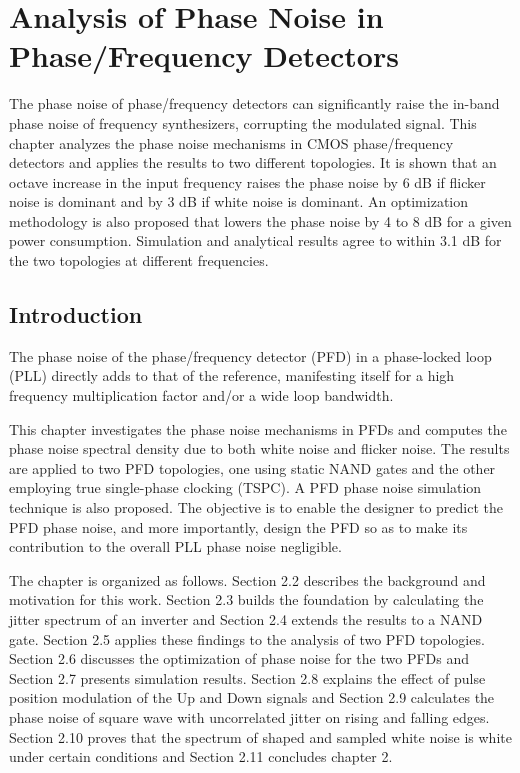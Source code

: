 \chapter{Analysis of Phase Noise in Phase/Frequency Detectors}

The phase noise of phase/frequency detectors can significantly raise the in-band phase noise of frequency synthesizers, corrupting the modulated
signal. This chapter analyzes the phase noise mechanisms in CMOS phase/frequency detectors and applies the results to two different topologies. It is
shown that an octave increase in the input frequency raises the phase noise by 6 dB if flicker noise is dominant and by 3 dB if white noise is
dominant. An optimization methodology is also proposed that lowers the phase noise by 4 to 8 dB for a given power consumption. Simulation and
analytical results agree to within 3.1 dB for the two topologies at different frequencies.



\section{Introduction}

The phase noise of the phase/frequency detector (PFD) in a phase-locked loop (PLL) directly adds to that of the reference,
manifesting itself for a high frequency multiplication factor and/or a wide loop bandwidth.

This chapter investigates the phase noise mechanisms in PFDs and computes the phase noise spectral density due to both white noise and flicker
noise. The results are applied to two PFD topologies, one using static NAND gates and the other employing true single-phase clocking (TSPC). A PFD
phase noise simulation technique is also proposed. The objective is to enable the designer to predict the PFD phase noise, and more importantly,
design the PFD so as to make its contribution to the overall PLL phase noise negligible.

The chapter is organized as follows. Section 2.2 describes the background and motivation for this work. Section 2.3 builds the foundation by
calculating the jitter spectrum of an inverter and Section 2.4 extends the results to a NAND gate. Section 2.5 applies
these findings to the analysis of two PFD topologies. Section 2.6 discusses the optimization of phase noise for the two PFDs and Section 2.7
presents simulation results. Section 2.8 explains the effect of pulse position modulation of the Up and Down signals and Section 2.9 calculates 
the phase noise of square wave with uncorrelated jitter on rising and falling edges. Section 2.10 proves that the spectrum of shaped and sampled 
white noise is white under certain conditions and Section 2.11 concludes chapter 2.


